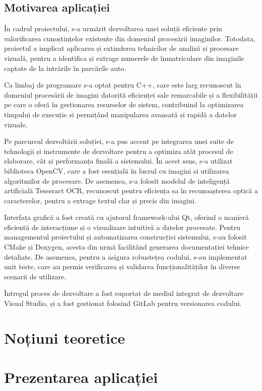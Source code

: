 \documentclass[a4paper,12pt]{report}
\begin{document}
\section{Motivarea aplicației}
În cadrul proiectului, s-a urmărit dezvoltarea unei soluții eficiente prin valorificarea cunoștințelor existente din domeniul procesării imaginilor. Totodata, proiectul a implicat aplicarea și extinderea tehnicilor de analiză și procesare vizuală, pentru a identifica și extrage numerele de înmatriculare din imaginile captate de la intrările în parcările auto.

Ca limbaj de programare s-a optat pentru C++, care este larg recunoscut în domeniul procesării de imagini datorită eficienței sale remarcabile și a flexibilității pe care o oferă în gestionarea resurselor de sistem, contribuind la optimizarea timpului de execuție si permițând manipularea avansată și rapidă a datelor vizuale.

Pe parcursul dezvoltării soluției, s-a pus accent pe integrarea unei suite de tehnologii și instrumente de dezvoltare pentru a optimiza atât procesul de elaborare, cât și performanța finală a sistemului. În acest sens, s-a utilizat biblioteca OpenCV, care a fost esențială în lucrul cu imagini si utilizarea algoritmilor de procesare. De asemenea, s-a folosit modelul de inteligență artificială Tesseract OCR, recunoscut pentru eficiența sa în recunoașterea optică a caracterelor, pentru a extrage textul clar și precis din imagini.

Interfața grafică a fost creată cu ajutorul framework-ului Qt, oferind o manieră eficientă de interacțiune și o vizualizare intuitivă a datelor procesate. Pentru managementul proiectului și automatizarea construcției sistemului, s-au folosit CMake și Doxygen, acesta din urmă facilitând generarea documentației tehnice detaliate. De asemenea, pentru a asigura robustețea codului, s-au implementat unit teste, care au permis verificarea și validarea funcționalităților în diverse scenarii de utilizare.

Întregul proces de dezvoltare a fost suportat de mediul integrat de dezvoltare Visual Studio, și a fost gestionat folosind GitLab pentru versionarea codului.

\chapter{Noțiuni teoretice}

\chapter{Prezentarea aplicației}
\end{document}
